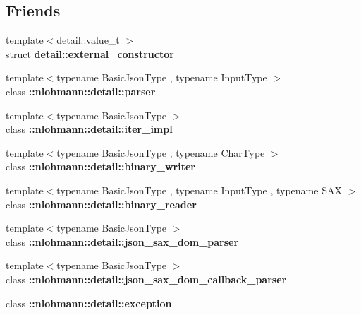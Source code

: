 \subsection*{Friends}
\begin{DoxyCompactItemize}
\item 
\mbox{\label{classnlohmann_1_1basic__json_a6275ed57bae6866cdf5db5370a7ad47c}} 
{\footnotesize template$<$detail\+::value\+\_\+t $>$ }\\struct {\bfseries detail\+::external\+\_\+constructor}
\item 
\mbox{\label{classnlohmann_1_1basic__json_ac8f3125911eb018ef4ab00d879487baf}} 
{\footnotesize template$<$typename Basic\+Json\+Type , typename Input\+Type $>$ }\\class {\bfseries \+::nlohmann\+::detail\+::parser}
\item 
\mbox{\label{classnlohmann_1_1basic__json_a842e5c7ca096025c18b11e715d3401f4}} 
{\footnotesize template$<$typename Basic\+Json\+Type $>$ }\\class {\bfseries \+::nlohmann\+::detail\+::iter\+\_\+impl}
\item 
\mbox{\label{classnlohmann_1_1basic__json_a69d491bbda88ade6d3c7a2b11309e8bf}} 
{\footnotesize template$<$typename Basic\+Json\+Type , typename Char\+Type $>$ }\\class {\bfseries \+::nlohmann\+::detail\+::binary\+\_\+writer}
\item 
\mbox{\label{classnlohmann_1_1basic__json_aa226ed5103dfd10e27e562d35a3a106b}} 
{\footnotesize template$<$typename Basic\+Json\+Type , typename Input\+Type , typename S\+AX $>$ }\\class {\bfseries \+::nlohmann\+::detail\+::binary\+\_\+reader}
\item 
\mbox{\label{classnlohmann_1_1basic__json_a47aabb1eceae32e8a6e8e7f0ff34be60}} 
{\footnotesize template$<$typename Basic\+Json\+Type $>$ }\\class {\bfseries \+::nlohmann\+::detail\+::json\+\_\+sax\+\_\+dom\+\_\+parser}
\item 
\mbox{\label{classnlohmann_1_1basic__json_a95574da8d12905ea99dc348934c837da}} 
{\footnotesize template$<$typename Basic\+Json\+Type $>$ }\\class {\bfseries \+::nlohmann\+::detail\+::json\+\_\+sax\+\_\+dom\+\_\+callback\+\_\+parser}
\item 
\mbox{\label{classnlohmann_1_1basic__json_abdcb15d025676b4d3db0f32a50f4393f}} 
class {\bfseries \+::nlohmann\+::detail\+::exception}
\end{DoxyCompactItemize}
